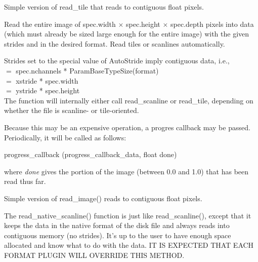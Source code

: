 Simple version of {\kw read_tile} that reads to contiguous float pixels.
\apiend


Read the entire image of {\kw spec.width} $\times$ {\kw spec.height}
$\times$ {\kw spec.depth}
pixels into data (which must already be sized large enough for
the entire image) with the given strides and in the desired
format.  Read tiles or scanlines automatically.  

Strides set to the special value of {\kw AutoStride} imply contiguous
data, i.e., \\
 $=$ {\kw spec.nchannels * ParamBaseTypeSize(format)} \\
 $=$ {\kw xstride * spec.width} \\
 $=$ {\kw ystride * spec.height} \\
The function will internally either call {\kw read_scanline} or 
{\kw read_tile}, depending on whether the file is scanline- or
tile-oriented.

Because this may be an expensive operation, a progres callback may be passed.
Periodically, it will be called as follows:\\
\begin{code}
    progress_callback (progress_callback_data, float done)
\end{code}
\noindent where \emph{done} gives the portion of the image 
(between 0.0 and 1.0) that has been read thus far.
\apiend

Simple version of {\kw read_image()} reads to contiguous float pixels.
\apiend

The {\kw read_native_scanline()} function is just like {\kw
  read_scanline()}, except that it keeps the data in the native format
of the disk file and always reads into contiguous memory (no strides).
It's up to the user to have enough space allocated and know what to do
with the data.  IT IS EXPECTED THAT EACH FORMAT PLUGIN WILL OVERRIDE
THIS METHOD.
\apiend


